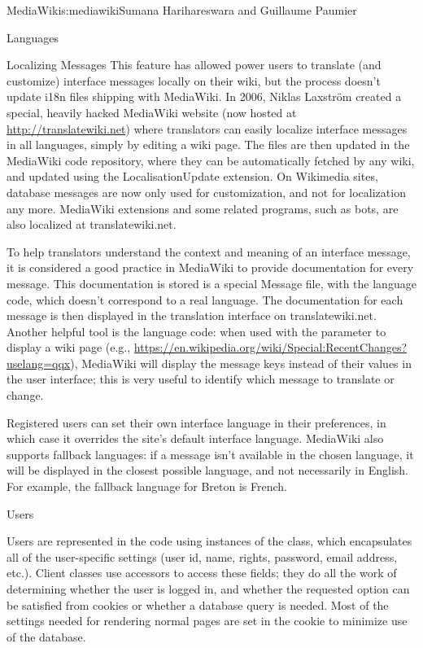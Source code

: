 \begin{aosachapter}{MediaWiki}{s:mediawiki}{Sumana Harihareswara and Guillaume Paumier}
\begin{aosasect1}{Languages}
\begin{aosasect2}{Localizing Messages}
This feature has allowed power users to translate (and customize)
interface messages locally on their wiki, but the process doesn't
update i18n files shipping with MediaWiki. In 2006, Niklas Laxström
created a special, heavily hacked MediaWiki website (now hosted at
\url{http://translatewiki.net}) where translators can easily localize
interface messages in all languages, simply by editing a wiki
page. The  files are then updated in the
MediaWiki code repository, where they can be automatically fetched by
any wiki, and updated using the LocalisationUpdate extension. On
Wikimedia sites, database messages are now only used for
customization, and not for localization any more. MediaWiki extensions
and some related programs, such as bots, are also localized at
translatewiki.net.

To help translators understand the context and meaning of an interface
message, it is considered a good practice in MediaWiki to provide
documentation for every message. This documentation is stored is a
special Message file, with the  language code, which doesn't
correspond to a real language. The documentation for each message is
then displayed in the translation interface on
translatewiki.net. Another helpful tool is the  language
code: when used with the  parameter to display a
wiki page (e.g.,
\url{https://en.wikipedia.org/wiki/Special:RecentChanges?uselang=qqx}),
MediaWiki will display the message keys instead of their values in the
user interface; this is very useful to identify which message to
translate or change.

Registered users can set their own interface language in their
preferences, in which case it overrides the site's default interface
language. MediaWiki also supports fallback languages: if a message
isn't available in the chosen language, it will be displayed in the
closest possible language, and not necessarily in English. For
example, the fallback language for Breton is French.

\end{aosasect2}

\end{aosasect1}

\begin{aosasect1}{Users}

Users are represented in the code using instances of the 
class, which encapsulates all of the user-specific settings (user id,
name, rights, password, email address, etc.). Client classes use
accessors to access these fields; they do all the work of determining
whether the user is logged in, and whether the requested option can be
satisfied from cookies or whether a database query is needed. Most of
the settings needed for rendering normal pages are set in the cookie
to minimize use of the database.


\end{aosasect1}
\end{aosachapter}
